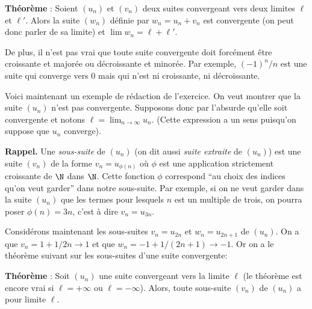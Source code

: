 \documentclass[11pt,a4paper]{article}
\begin{document}
\textbf{Th\'eor\`eme} : Soient $(u_n)$ et $(v_n)$ deux suites
convergeant vers deux limites $\ell$ et $\ell'$. Alors la suite $(w_n)$ définie par
$w_n=u_n+v_n$ est convergente (on peut donc parler de sa limite)
et $\lim w_n=\ell+\ell'$.

De plus, il n'est pas vrai que toute suite convergente
doit forc\'ement \^etre croissante et major\'ee ou d\'ecroissante
et minor\'ee. Par exemple, $(-1)^n/n$ est une suite qui converge
vers $0$ mais qui n'est ni croissante, ni d\'ecroissante. 

\bigskip

Voici maintenant un exemple de r\'edaction de l'exercice.  On veut
montrer que la suite $(u_n)$ n'est pas convergente. Supposons donc
par l'absurde qu'elle soit convergente et notons
$\ell=\lim_{n\rightarrow\infty} u_n$. (Cette expression a un sens puisqu'on
suppose que $u_n$ converge).

{\bf  Rappel.} Une {\em sous-suite} de $(u_n)$ (on dit aussi  {\em
suite extraite} de $(u_n)$) est une suite $(v_n)$ de la forme
$v_n=u_{\phi(n)}$ o\`u $\phi$ est une application strictement
croissante de $\N$ dans $\N$. Cette fonction $\phi$ correspond
``au choix des indices qu'on veut garder'' dans notre sous-suite.
Par exemple, si on ne veut garder dans la suite $(u_n)$ que les
termes pour lesquels $n$ est un multiple de trois, on pourra poser
$\phi(n)=3n$, c'est \`a dire $v_n=u_{3n}$.

\vspace{0.3cm}

Consid\'erons maintenant les sous-suites $v_n=u_{2n}$ et
$w_n=u_{2n+1}$ de $(u_n)$. On a que $v_n=1+1/2n\rightarrow1$ et que
$w_n=-1+1/(2n+1)\rightarrow -1$. Or on a le th\'eor\`eme suivant sur les
sous-suites d'une suite convergente:

\textbf{Th\'eor\`eme} : Soit $(u_n)$ une suite convergeant  vers la
limite $\ell$ (le th\'eor\`eme est encore vrai si $\ell=+\infty$ ou
$\ell=-\infty$). Alors, toute sous-suite $(v_n)$ de $(u_n)$ a pour limite
$\ell$.
\end{document}
